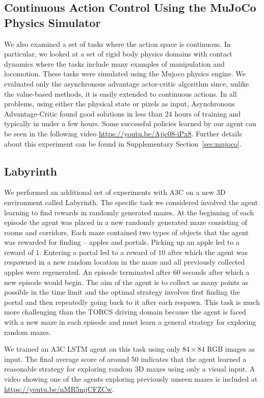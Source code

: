 \subsection{Continuous Action Control Using the MuJoCo Physics Simulator}
We also examined a set of tasks where the action space is continuous.
In particular, we looked at a set of rigid body physics domains with contact dynamics
where the tasks include many examples of manipulation and locomotion.
These tasks were simulated using the Mujoco physics engine.
We evaluated only the asynchronous advantage actor-critic algorithm since, unlike the value-based methods, it is easily extended to continuous actions.
In all problems, using either the physical state or pixels as input, Asynchronous Advantage-Critic found good solutions in less than 24 hours of training and typically in under a few hours.
%
Some successful policies learned by our agent can be seen in the following video \url{https://youtu.be/Ajjc08-iPx8}.
Further details about this experiment can be found in Supplementary Section~\ref{sec:mujoco}.

\subsection{Labyrinth}

%
%
%
%
%
%

We performed an additional set of experiments with A3C on a new 3D environment called Labyrinth.
The specific task we considered involved the agent learning to find rewards in randomly generated mazes.
At the beginning of each episode the agent was placed in a new randomly generated maze consisting of rooms and corridors.
Each maze contained two types of objects that the agent was rewarded for finding -- apples and portals.
Picking up an apple led to a reward of $1$.  Entering a portal led to a reward of $10$ after which the agent was respawned in a new random location in the maze and all previously collected apples were regenerated.
An episode terminated after 60 seconds after which a new episode would begin.
The aim of the agent is to collect as many points as possible in the time limit and the optimal strategy involves first finding the portal and then repeatedly going back to it after each respawn.
This task is much more challenging than the TORCS driving domain because the agent is faced with a new maze in each episode and must learn a general strategy for exploring random mazes.

We trained an A3C LSTM agent on this task using only $84\times 84$ RGB images as input.
%
The final average score of around 50 indicates that the agent learned a reasonable strategy for exploring random 3D maxes using only a visual input.
%
A video showing one of the agents exploring previously unseen mazes is included at \url{https://youtu.be/nMR5mjCFZCw}.

